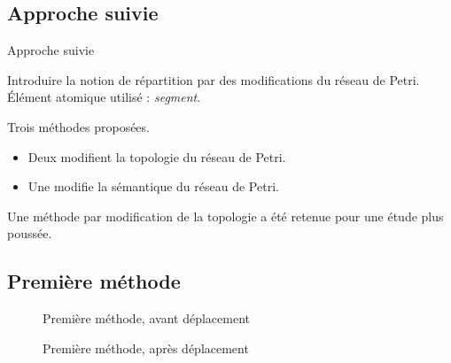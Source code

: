 \subsection{Approche suivie}
\begin{frame}{Approche suivie}
	\begin{itemize}
		\itemar Introduire la notion de répartition par des modifications du réseau de Petri.
		\itemar Élément atomique utilisé : \textit{segment}.
	\end{itemize}

	Trois méthodes proposées.
	\begin{itemize}
		\item Deux modifient la topologie du réseau de Petri.
		\item Une modifie la sémantique du réseau de Petri.
	\end{itemize}
	
	Une méthode par modification de la topologie a été retenue pour une étude plus poussée.
\end{frame}
\subsection{Première méthode}
\begin{frame}
	\begin{figure}[h!]
		\centering
		
		\caption{Première méthode, avant déplacement}
		\label{fig:deplacementMethode1}
	\end{figure}
\end{frame}

\begin{frame}
	\begin{figure}[h!]
		\centering
		
		\caption{Première méthode, après déplacement}
		\label{fig:deplacementMethode12}
	\end{figure}
\end{frame}
